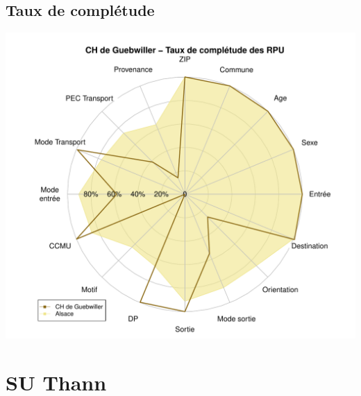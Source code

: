 \documentclass[12pt,english,french,twoside]{book}\usepackage[]{graphicx}\usepackage[]{color}
\makeatletter
\def\maxwidth{ %
  \ifdim\Gin@nat@width>\linewidth
    \linewidth
  \else
    \Gin@nat@width
  \fi
}
\newenvironment{knitrout}{}{} %
\makeatother
\begin{document}
% 
% 
% 
% 

\section*{Taux de complétude}


\begin{knitrout}
\color{fgcolor}
\includegraphics[width=\maxwidth]{figure/compl_geb2-1} 

\end{knitrout}
\chapter{SU Thann}
\end{document}

